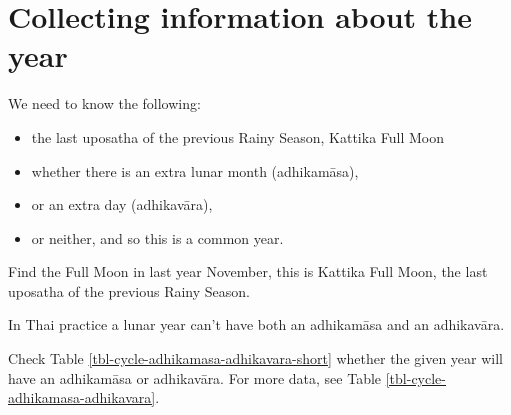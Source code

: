 \documentclass[11pt,oneside]{memoir-article}
\begin{document}
\section{Collecting information about the year}
\label{sec-1-1}

We need to know the following:

\begin{itemize}
\item the last uposatha of the previous Rainy Season, Kattika Full Moon
\item whether there is an extra lunar month (adhikamāsa),
\item or an extra day (adhikavāra),
\item or neither, and so this is a common year.
\end{itemize}

Find the Full Moon in last year November, this is Kattika Full Moon, the last
uposatha of the previous Rainy Season.

In Thai practice a lunar year can't have both an adhikamāsa and an adhikavāra.

Check Table \ref{tbl-cycle-adhikamasa-adhikavara-short} whether the given year
will have an adhikamāsa or adhikavāra. For more data, see Table
\ref{tbl-cycle-adhikamasa-adhikavara}.
\end{document}
